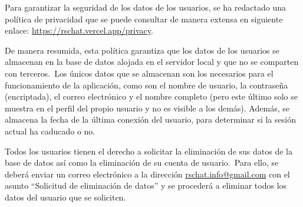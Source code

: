 
Para garantizar la seguridad de los datos de los usuarios, se ha redactado una política de privacidad
que se puede consultar de manera extensa en siguiente enlace:
\href{https://rschat.vercel.app/privacy}{https://rschat.vercel.app/privacy}.

De manera resumida, esta política garantiza que los datos de los usuarios se almacenan en la base de datos alojada en el
servidor local y que no se comparten con terceros.\ Los únicos datos que se almacenan son los necesarios para el
funcionamiento de la aplicación, como son el nombre de usuario, la contraseña (encriptada), el correo electrónico y
el nombre completo (pero este último solo se muestra en el perfil del propio usuario y no es visible a los demás).
Además, se almacena la fecha de la última conexión del usuario, para determinar si la sesión actual ha caducado o no.

Todos los usuarios tienen el derecho a solicitar la eliminación de sus datos de la base de datos así como
la eliminación de su cuenta de usuario.\ Para ello, se deberá enviar un correo electrónico a la dirección
\href{mailto:rschat.info@gmail.com}{rschat.info@gmail.com} con el asunto ``Solicitud de eliminación de datos'' y se
procederá a eliminar todos los datos del usuario que se soliciten.

